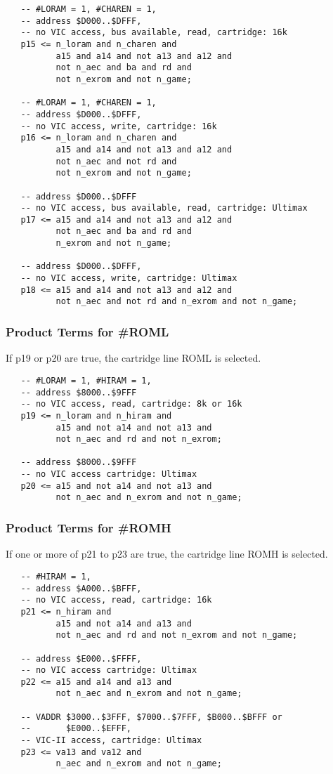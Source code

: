 \begin{lstlisting}
   -- #LORAM = 1, #CHAREN = 1,
   -- address $D000..$DFFF,
   -- no VIC access, bus available, read, cartridge: 16k
   p15 <= n_loram and n_charen and
          a15 and a14 and not a13 and a12 and
          not n_aec and ba and rd and
          not n_exrom and not n_game;

   -- #LORAM = 1, #CHAREN = 1,
   -- address $D000..$DFFF,
   -- no VIC access, write, cartridge: 16k
   p16 <= n_loram and n_charen and
          a15 and a14 and not a13 and a12 and
          not n_aec and not rd and
          not n_exrom and not n_game;

   -- address $D000..$DFFF
   -- no VIC access, bus available, read, cartridge: Ultimax
   p17 <= a15 and a14 and not a13 and a12 and
          not n_aec and ba and rd and
          n_exrom and not n_game;

   -- address $D000..$DFFF,
   -- no VIC access, write, cartridge: Ultimax
   p18 <= a15 and a14 and not a13 and a12 and
          not n_aec and not rd and n_exrom and not n_game;
\end{lstlisting}

\subsubsection{Product Terms for \#ROML}

If p19 or p20 are true, the cartridge line ROML is selected.

\begin{lstlisting}
   -- #LORAM = 1, #HIRAM = 1,
   -- address $8000..$9FFF
   -- no VIC access, read, cartridge: 8k or 16k
   p19 <= n_loram and n_hiram and
          a15 and not a14 and not a13 and
          not n_aec and rd and not n_exrom;

   -- address $8000..$9FFF
   -- no VIC access cartridge: Ultimax
   p20 <= a15 and not a14 and not a13 and
          not n_aec and n_exrom and not n_game;
\end{lstlisting}

\subsubsection{Product Terms for \#ROMH}

If one or more of p21 to p23 are true, the cartridge line ROMH is selected.

\begin{lstlisting}
   -- #HIRAM = 1,
   -- address $A000..$BFFF,
   -- no VIC access, read, cartridge: 16k
   p21 <= n_hiram and
          a15 and not a14 and a13 and
          not n_aec and rd and not n_exrom and not n_game;

   -- address $E000..$FFFF,
   -- no VIC access cartridge: Ultimax
   p22 <= a15 and a14 and a13 and
          not n_aec and n_exrom and not n_game;

   -- VADDR $3000..$3FFF, $7000..$7FFF, $B000..$BFFF or
   --       $E000..$EFFF,
   -- VIC-II access, cartridge: Ultimax
   p23 <= va13 and va12 and
          n_aec and n_exrom and not n_game;
\end{lstlisting}

